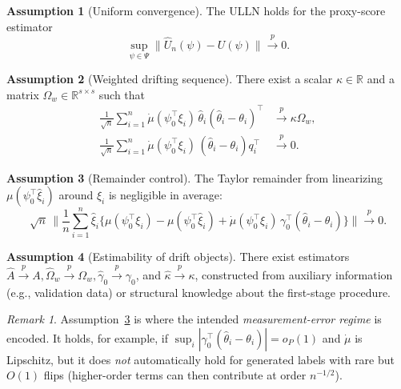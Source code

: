 \documentclass[11pt]{article}
\theoremstyle{definition}
\newtheorem{assumption}{Assumption}
\theoremstyle{remark}
\newtheorem{remark}{Remark}
\newcommand{\R}{\mathbb{R}}
\newcommand{\toP}{\xrightarrow{\,p\,}}
\begin{document}
\begin{assumption}[Uniform convergence]\label{ass:ULLN}
The ULLN holds for the proxy-score estimator
\begin{equation}
\sup_{\psi\in\Psi}\big\|\hat U_n(\psi)-U(\psi)\big\|\toP 0.
\label{eq:U-unif}
\end{equation}
\end{assumption}

\begin{assumption}[Weighted drifting sequence]\label{ass:drift}
There exist a scalar $\kappa\in\R$ and a matrix $\Omega_w\in\R^{s\times s}$ such that
\begin{align}
\frac{1}{\sqrt{n}}\sum_{i=1}^n \dot\mu(\psi_0^\top\xi_i)\,\hat\theta_i(\hat\theta_i-\theta_i)^\top &\toP \kappa\Omega_w,\label{eq:drift1}\\
\frac{1}{\sqrt{n}}\sum_{i=1}^n \dot\mu(\psi_0^\top\xi_i)\,(\hat\theta_i-\theta_i)q_i^\top &\toP 0.
\label{eq:drift2}
\end{align}
\end{assumption}

\begin{assumption}[Remainder control]\label{ass:remainder}
The Taylor remainder from linearizing $\mu(\psi_0^\top\hat\xi_i)$ around $\xi_i$ is negligible in average:
\begin{equation}
\sqrt{n}\,\Bigg\|\frac{1}{n}\sum_{i=1}^n\hat\xi_i\Big\{\mu(\psi_0^\top\xi_i)-\mu(\psi_0^\top\hat\xi_i)+\dot\mu(\psi_0^\top\xi_i)\,\gamma_0^\top(\hat\theta_i-\theta_i)\Big\}\Bigg\|\toP 0.
\label{eq:remainder}
\end{equation}
\end{assumption}

\begin{assumption}[Estimability of drift objects]
There exist estimators $\hat A\toP A, \hat\Omega_w \toP \Omega_w, \hat\gamma_0 \toP \gamma_0$, and $\hat\kappa\toP\kappa$, constructed from auxiliary information (e.g., validation data) or structural knowledge about the first-stage procedure.
\end{assumption}

\begin{remark}
Assumption~\ref{ass:remainder} is where the intended \emph{measurement-error regime} is encoded. It holds, for example, if $\sup_i |\gamma_0^\top(\hat\theta_i-\theta_i)|=o_P(1)$ and $\dot\mu$ is Lipschitz, but it does \emph{not} automatically hold for generated labels with rare but $O(1)$ flips (higher-order terms can then contribute at order $n^{-1/2}$).
\end{remark}
\end{document}
